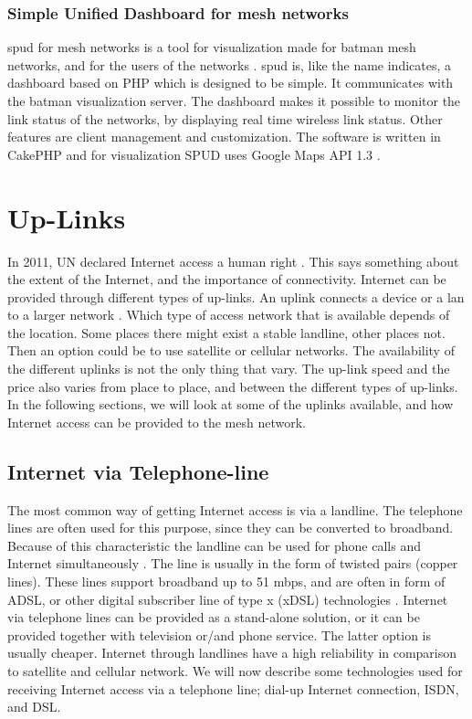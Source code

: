 \subsubsection{Simple Unified Dashboard for mesh networks}
\gls{spud} for mesh networks is a tool for visualization made for \gls{batman} mesh networks, and for the users of the networks \cite{spud}. \gls{spud} is, like the name indicates, a dashboard based on PHP which is designed to be simple. It communicates with the \gls{batman} visualization server. The dashboard makes it possible to monitor the link status of the networks, by displaying real time wireless link status. Other features are client management and customization. The software is written in CakePHP and for visualization SPUD uses Google Maps API 1.3 \cite{spud}.

\section{Up-Links}
In 2011, UN declared Internet access a human right \cite{HR}. This says something about the extent of the Internet, and the importance of connectivity. Internet can be provided through different types of up-links. An uplink connects a device or a \gls{lan} to a larger network \cite{uplink}. Which type of access network that is available depends of the location. Some places there might exist a stable landline, other places not. Then an option could be to use satellite or cellular networks. The availability of the different uplinks is not the only thing that vary. The up-link speed and the price also varies from place to place, and between the different types of up-links. In the following sections, we will look at some of the uplinks available, and how Internet access can be provided to the mesh network.  

\subsection{Internet via Telephone-line}
The most common way of getting Internet access is via a landline. The telephone lines are often used for this purpose, since they can be converted to broadband. Because of this characteristic the landline can be used for phone calls and Internet simultaneously \cite{internet}. The line is usually in the form of twisted pairs (copper lines). These lines support broadband up to 51 \gls{mbps}, and are often in form of ADSL, or other digital subscriber line of type x (xDSL) technologies \cite{audestad}. Internet via telephone lines can be provided as a stand-alone solution, or it can be provided together with television or/and phone service. The latter option is usually cheaper. Internet through landlines have a high reliability \cite{cablevssatellite} in comparison to satellite and cellular network. We will now describe some technologies used for receiving Internet access via a telephone line; dial-up Internet connection, ISDN, and DSL. 

